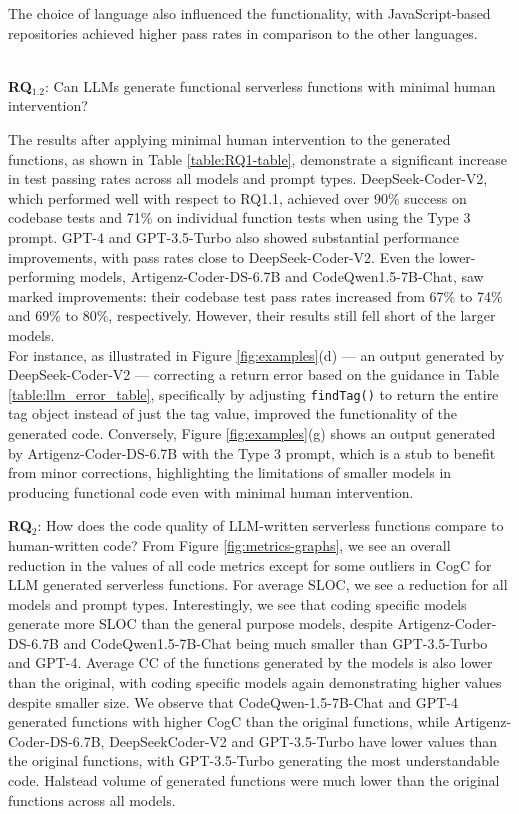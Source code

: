 The choice of language also influenced the functionality, with JavaScript-based repositories achieved higher pass rates in comparison to the other languages.  

\hfill\\
\textbf{RQ}$_{1.2}$: Can LLMs generate functional serverless functions with minimal human intervention?

The results after applying minimal human intervention to the generated functions, as shown in Table \ref{table:RQ1-table}, demonstrate a significant increase in test passing rates across all models and prompt types. DeepSeek-Coder-V2, which performed well with respect to RQ1.1, achieved over 90\% success on codebase tests and 71\% on individual function tests when using the Type 3 prompt. GPT-4 and GPT-3.5-Turbo also showed substantial performance improvements, with pass rates close to DeepSeek-Coder-V2. Even the lower-performing models, Artigenz-Coder-DS-6.7B and CodeQwen1.5-7B-Chat, saw marked  improvements: their codebase test pass rates increased from 67\% to 74\% and 69\% to 80\%, respectively. However, their results still fell short of the larger models. \\
For instance, as illustrated in Figure \ref{fig:examples}(d) — an output generated by DeepSeek-Coder-V2 — correcting a return error based on the guidance in Table \ref{table:llm_error_table}, specifically by adjusting \texttt{findTag()} to return the entire tag object instead of just the tag value, improved the functionality of the generated code. Conversely, Figure \ref{fig:examples}(g) shows an output generated by Artigenz-Coder-DS-6.7B with the Type 3 prompt, which is a stub to benefit from minor corrections, highlighting the limitations of smaller models in producing functional code even with minimal human intervention.

\textbf{RQ}$_2$: How does the code quality of LLM-written serverless functions compare to human-written code?
From Figure \ref{fig:metrics-graphs}, we see an overall reduction in the values of all code metrics except for some outliers in CogC for LLM generated serverless functions. For average SLOC, we see a reduction for all models and prompt types. Interestingly, we see that coding specific models generate more SLOC than the general purpose models, despite Artigenz-Coder-DS-6.7B and CodeQwen1.5-7B-Chat being much smaller than GPT-3.5-Turbo and GPT-4. Average CC of the functions generated by the models is also lower than the original, with coding specific models again demonstrating higher values despite smaller size. We observe that CodeQwen-1.5-7B-Chat and GPT-4 generated functions with higher CogC than the original functions, while Artigenz-Coder-DS-6.7B, DeepSeekCoder-V2 and GPT-3.5-Turbo have lower values than the original functions, with GPT-3.5-Turbo generating the most understandable code. Halstead volume of generated functions were much lower than the original functions across all models.  


